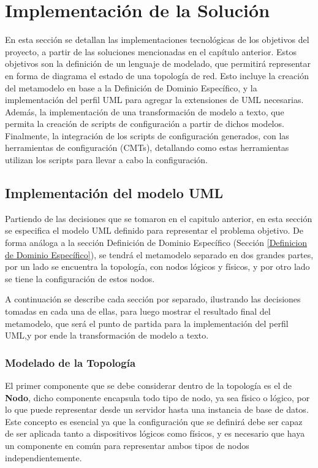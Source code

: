 \chapter{Implementación de la Solución} \label{Implementacion de Solucion}

En esta sección se detallan las implementaciones tecnológicas de los objetivos del proyecto, a partir de las soluciones mencionadas en el capítulo anterior.
Estos objetivos son la definición de un lenguaje de modelado, que permitirá representar en forma de diagrama el estado de una topología de red. Esto incluye la creación del metamodelo en base a la Definición de Dominio Específico, y la implementación del perfil UML para agregar la extensiones de UML necesarias. 
Además, la implementación de una transformación de modelo a texto, que permita la creación de scripts de configuración a partir de dichos modelos.
Finalmente, la integración de los scripts de configuración generados, con las herramientas de configuración (CMTs), detallando como estas herramientas utilizan los scripts para llevar a cabo la configuración. 

\section{Implementación del modelo UML}
Partiendo de las decisiones que se tomaron en el capitulo anterior, en esta sección se especifica el modelo UML definido para representar el problema objetivo. De forma análoga a la sección Definición de Dominio Específico (Sección \ref{Definicion de Dominio Específico}), se tendrá el metamodelo separado en dos grandes partes, por un lado se encuentra la topología, con nodos lógicos y físicos, y por otro lado se tiene la configuración de estos nodos.

A continuación se describe cada sección por separado, ilustrando las decisiones tomadas en cada una de ellas, para luego mostrar el resultado final del metamodelo, que será el punto de partida para la implementación del perfil UML,y por ende la transformación de modelo a texto.

\subsection{Modelado de la Topología}
El primer componente que se debe considerar dentro de la topología es el de \textbf{Nodo}, dicho componente encapsula todo tipo de nodo, ya sea físico o lógico, por lo que puede representar desde un servidor hasta una instancia de base de datos. 
Este concepto es esencial ya que la configuración que se definirá debe ser capaz de ser aplicada tanto a dispositivos lógicos como físicos, y es necesario que haya un componente en común para representar ambos tipos de nodos independientemente.

